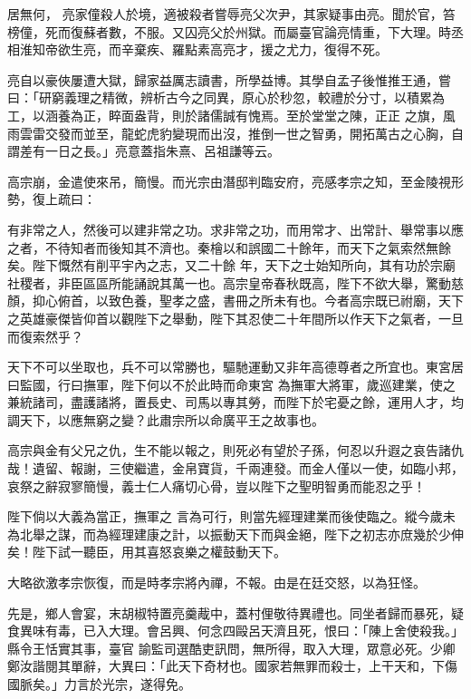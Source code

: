 \begin{pinyinscope}
 居無何，
 亮家僮殺人於境，適被殺者嘗辱亮父次尹，其家疑事由亮。聞於官，笞榜僮，死而復蘇者數，不服。又囚亮父於州獄。而屬臺官論亮情重，下大理。時丞相淮知帝欲生亮，而辛棄疾、羅點素高亮才，援之尤力，復得不死。



 亮自以豪俠屢遭大獄，歸家益厲志讀書，所學益博。其學自孟子後惟推王通，嘗曰：「研窮義理之精微，辨析古今之同異，原心於秒忽，較禮於分寸，以積累為工，以涵養為正，睟面盎背，則於諸儒誠有愧焉。至於堂堂之陳，正正
 之旗，風雨雲雷交發而並至，龍蛇虎豹變現而出沒，推倒一世之智勇，開拓萬古之心胸，自謂差有一日之長。」亮意蓋指朱熹、呂祖謙等云。



 高宗崩，金遣使來吊，簡慢。而光宗由潛邸判臨安府，亮感孝宗之知，至金陵視形勢，復上疏曰：



 有非常之人，然後可以建非常之功。求非常之功，而用常才、出常計、舉常事以應之者，不待知者而後知其不濟也。秦檜以和誤國二十餘年，而天下之氣索然無餘矣。陛下慨然有削平宇內之志，又二十餘
 年，天下之士始知所向，其有功於宗廟社稷者，非臣區區所能誦說其萬一也。高宗皇帝春秋既高，陛下不欲大舉，驚動慈顏，抑心俯首，以致色養，聖孝之盛，書冊之所未有也。今者高宗既已祔廟，天下之英雄豪傑皆仰首以觀陛下之舉動，陛下其忍使二十年間所以作天下之氣者，一旦而復索然乎？



 天下不可以坐取也，兵不可以常勝也，驅馳運動又非年高德尊者之所宜也。東宮居曰監國，行曰撫軍，陛下何以不於此時而命東宮
 為撫軍大將軍，歲巡建業，使之兼統諸司，盡護諸將，置長史、司馬以專其勞，而陛下於宅憂之餘，運用人才，均調天下，以應無窮之變？此肅宗所以命廣平王之故事也。



 高宗與金有父兄之仇，生不能以報之，則死必有望於子孫，何忍以升遐之哀告諸仇哉！遺留、報謝，三使繼遣，金帛寶貨，千兩連發。而金人僅以一使，如臨小邦，哀祭之辭寂寥簡慢，義士仁人痛切心骨，豈以陛下之聖明智勇而能忍之乎！



 陛下倘以大義為當正，撫軍之
 言為可行，則當先經理建業而後使臨之。縱今歲未為北舉之謀，而為經理建康之計，以振動天下而與金絕，陛下之初志亦庶幾於少伸矣！陛下試一聽臣，用其喜怒哀樂之權鼓動天下。



 大略欲激孝宗恢復，而是時孝宗將內禪，不報。由是在廷交怒，以為狂怪。



 先是，鄉人會宴，末胡椒特置亮羹胾中，蓋村俚敬待異禮也。同坐者歸而暴死，疑食異味有毒，已入大理。會呂興、何念四毆呂天濟且死，恨曰：「陳上舍使殺我。」縣令王恬實其事，臺官
 諭監司選酷吏訊問，無所得，取入大理，眾意必死。少卿鄭汝諧閱其單辭，大異曰：「此天下奇材也。國家若無罪而殺士，上干天和，下傷國脈矣。」力言於光宗，遂得免。




\end{pinyinscope}
